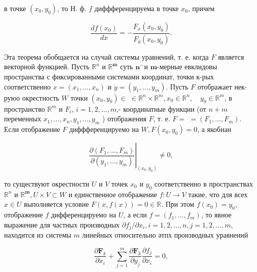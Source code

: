 \documentclass[10pt]{article}
\begin{document}
в точке $\left(x_{0}, y_{0}\right)$, то Н. ф. $f$ диффференцируема в точке $x_{0}$, причем



\[

\frac{d f\left(x_{0}\right)}{d x}=-\frac{F_{x}\left(x_{0}, y_{0}\right)}{F_{y}\left(x_{0}, y_{0}\right)} .

\]



Эта теорема обобщается на случай системы уравнений, т. е. когда $F$ является векторной функцией. Пусть $\mathbb{R}^{n}$ и $\mathbb{R}^{\boldsymbol{m}}$ суть $\boldsymbol{n}^{-}$и $\boldsymbol{m}$-мерные евклидовы пространства с фиксированными системами координат, точки к-рых соответственно $x=\left(x_{1}, \ldots, x_{n}\right)$ и $\dot{y}=\left(y_{1}, \ldots, y_{m}\right)$. Пусть $F$ отображает нек-руюо окрестность $W$ точки $\left(x_{0}, y_{0}\right) \in$ $\in \mathbb{R}^{n} \times \mathbb{R}^{m}, x_{0} \in \mathbb{R}^{n}, \quad y_{0} \in \mathbb{R}^{m}$, в пространство $\mathbb{R}^{m}$ и $F_{i}$, $i=1,2, \ldots, m$,- координатные функции (от $n+m$ переменных $x_{1}, \ldots, x_{n}, y_{1}, \ldots, y_{m}$ ) отображения $F$, т. е. $F=$ $=\left(F_{1}, \ldots, F_{m}\right)$. Если отображение $F$ диффференцируемо на $W, F\left(x_{0}, y_{0}\right)=0$, а якобиан



\[

\left.\frac{\partial\left(F_{1}, \ldots, F_{m}\right)}{\partial\left(y_{1}, \ldots, y_{m}\right)}\right|_{\left(x_{0}, y_{0}\right)} \neq 0,

\]



то существуют окрестности $U$ и $V$ точек $x_{0}$ и $y_{0}$ соответственно в пространствах $\mathbb{R}^{n}$ и $\mathbb{R}^{\boldsymbol{m}}, U \times V \subset W$ и единственное отображение $f: U \rightarrow V$ такие, что для всех $x \in U$ выполняется условие $F(x, f(x))=0 \in \mathbb{R}$. При этом $f\left(x_{0}\right)=y_{0}$, отображение $f$ дифференцируемо на $U$, а если $f=\left(f_{1}, \ldots, f_{m}\right)$, то явное выражение для частных производных $\partial f_{j} / \partial x_{i}, i=1,2, \ldots, n, j=1,2, \ldots, m$, находится из системы $m$ линейных относительно әтпх производных уравнений



\[

\frac{\partial \boldsymbol{F}_{k}}{\partial x_{i}}+\sum_{j=1}^{m} \frac{\partial \boldsymbol{F}_{k}}{\partial y_{j}} \frac{\partial f_{j}}{\partial x_{i}}=0,

\]
\end{document}
